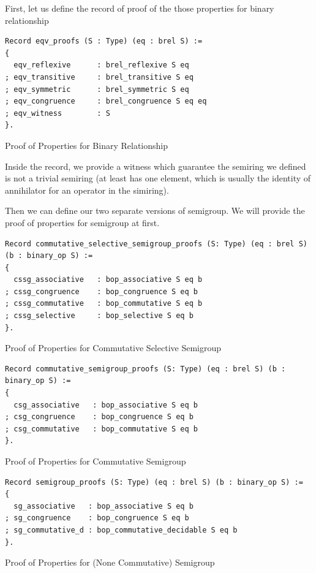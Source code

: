 \documentclass[a4paper,12pt,twoside,openright]{report}
\begin{document}
First, let us define the record of proof of the those properties for binary relationship
\begin{listing}[H]
\begin{verbatim}
Record eqv_proofs (S : Type) (eq : brel S) :=
{
  eqv_reflexive      : brel_reflexive S eq            
; eqv_transitive     : brel_transitive S eq           
; eqv_symmetric      : brel_symmetric S eq
; eqv_congruence     : brel_congruence S eq eq                                      
; eqv_witness        : S                                      
}.
\end{verbatim}
\caption{Proof of Properties for Binary Relationship} 
\label{coq:def:eqv_proofs}
\end{listing}
Inside the record, we provide a witness which guarantee the semiring we defined is not a trivial semiring (at least has one element, which is usually the identity of annihilator for an operator in the simiring).

Then we can define our two separate versions of semigroup. We will provide the proof of properties for semigroup at first.
\begin{listing}[H]
\begin{verbatim}
Record commutative_selective_semigroup_proofs (S: Type) (eq : brel S) (b : binary_op S) := 
{
  cssg_associative   : bop_associative S eq b
; cssg_congruence    : bop_congruence S eq b
; cssg_commutative   : bop_commutative S eq b
; cssg_selective     : bop_selective S eq b                                                                            
}.
\end{verbatim}
\caption{Proof of Properties for Commutative Selective Semigroup} 
\label{coq:def:commutative_selective_semigroup_proofs}
\end{listing}

\begin{listing}[H]
\begin{verbatim}
Record commutative_semigroup_proofs (S: Type) (eq : brel S) (b : binary_op S) := 
{
  csg_associative   : bop_associative S eq b
; csg_congruence    : bop_congruence S eq b
; csg_commutative   : bop_commutative S eq b                                      
}.
\end{verbatim}
\caption{Proof of Properties for Commutative Semigroup} 
\label{coq:def:commutative_semigroup_proofs}
\end{listing}

\begin{listing}[H]
\begin{verbatim}
Record semigroup_proofs (S: Type) (eq : brel S) (b : binary_op S) := 
{
  sg_associative   : bop_associative S eq b
; sg_congruence    : bop_congruence S eq b
; sg_commutative_d : bop_commutative_decidable S eq b                                      
}.
\end{verbatim}
\caption{Proof of Properties for (None Commutative) Semigroup} 
\label{coq:def:semigroup_proofs}
\end{listing}
\end{document}

